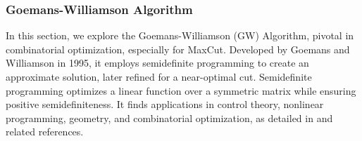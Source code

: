 \subsubsection{Goemans-Williamson Algorithm}
\label{sec: GW}
In this section, we explore the Goemans-Williamson (GW) Algorithm, pivotal in combinatorial optimization, especially for MaxCut. Developed by Goemans and Williamson in 1995, it employs semidefinite programming to create an approximate solution, later refined for a near-optimal cut. Semidefinite programming optimizes a linear function over a symmetric matrix while ensuring positive semidefiniteness. It finds applications in control theory, nonlinear programming, geometry, and combinatorial optimization, as detailed in \cite{GW-Algorithm} and related references.


